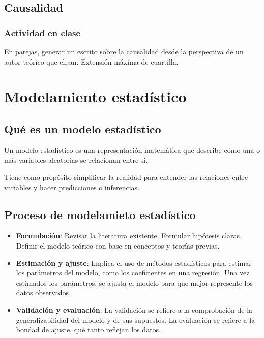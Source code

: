 \documentclass[
  letterpaper,
  DIV=11,
  numbers=noendperiod]{scrreprt}
\begin{document}
\section{Causalidad}\label{causalidad-1}

\subsection{Actividad en clase}\label{actividad-en-clase-1}

En parejas, generar un escrito sobre la causalidad desde la perspectiva
de un autor teórico que elijan. Extensión máxima de cuartilla.


\chapter{Modelamiento estadístico}\label{modelamiento-estaduxedstico-1}

\section{Qué es un modelo
estadístico}\label{quuxe9-es-un-modelo-estaduxedstico-1}

Un modelo estadístico es una representación matemática que describe cómo
una o más variables aleatorias se relacionan entre sí.

Tiene como propósito simplificar la realidad para entender las
relaciones entre variables y hacer predicciones o inferencias.

\section{Proceso de modelamieto
estadístico}\label{proceso-de-modelamieto-estaduxedstico}

\begin{itemize}
\item
  \textbf{Formulación}: Revisar la literatura existente. Formular
  hipótesis claras. Definir el modelo teórico con base en conceptos y
  teorías previas.
\item
  \textbf{Estimación y ajuste}: Implica el uso de métodos estadísticos
  para estimar los parámetros del modelo, como los coeficientes en una
  regresión. Una vez estimados los parámetros, se ajusta el modelo para
  que mejor represente los datos observados.
\item
  \textbf{Validación y evaluación}: La validación se refiere a la
  comprobación de la generalizabilidad del modelo y de sus supuestos. La
  evaluación se refiere a la bondad de ajuste, qué tanto reflejan los
  datos.
\end{itemize}
\end{document}
